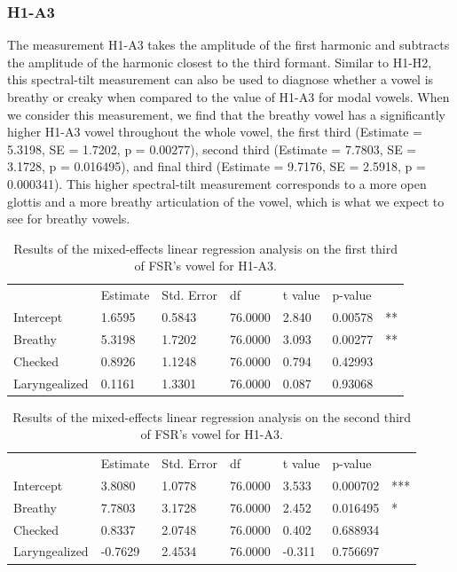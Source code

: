 \documentclass[12pt, letterpaper]{article}
\providecommand{\lsptoprule}{\midrule\toprule}
\providecommand{\lspbottomrule}{\bottomrule\midrule}
\begin{document}
\subsubsection{H1-A3}

The measurement H1-A3 takes the amplitude of the first harmonic and subtracts the amplitude of the harmonic closest to the third formant. Similar to H1-H2, this spectral-tilt measurement can also be used to diagnose whether a vowel is breathy or creaky when compared to the value of H1-A3 for modal vowels. When we consider this measurement, we find that the breathy vowel has a significantly higher H1-A3 vowel throughout the whole vowel, the first third (Estimate = 5.3198, SE = 1.7202, p = 0.00277), second third (Estimate = 7.7803, SE = 3.1728, p = 0.016495), and final third (Estimate = 9.7176, SE = 2.5918, p = 0.000341). This higher spectral-tilt measurement corresponds to a more open glottis and a more breathy articulation of the vowel, which is what we expect to see for breathy vowels. 

\begin{table}[!h]
    \centering
    \caption{Results of the mixed-effects linear regression analysis on the first third of FSR's vowel for H1-A3. }
    \label{tab:FSR_H1A3_First}
    \begin{tabular}{lllllll}
	\lsptoprule
					&  Estimate  & Std. Error & df & t value & p-value & \\
        Intercept       &  1.6595  & 0.5843 & 76.0000 & 2.840  & 0.00578 & ** \\  
  	Breathy   		&  5.3198  & 1.7202 & 76.0000 & 3.093  & 0.00277 & **\\
	Checked    		&  0.8926  & 1.1248 & 76.0000 & 0.794  & 0.42993 & \\
	Laryngealized	&  0.1161  & 1.3301 & 76.0000 & 0.087  & 0.93068 & \\
        \lspbottomrule
    \end{tabular}
\end{table}

\begin{table}[!h]
    \centering
    \caption{Results of the mixed-effects linear regression analysis on the second third of FSR's vowel for H1-A3. }
    \label{tab:FSR_H1A3_Second}
    \begin{tabular}{lllllll}
	\lsptoprule
					&  Estimate  & Std. Error & df & t value & p-value & \\
        Intercept       &  3.8080  & 1.0778 & 76.0000 &  3.533  & 0.000702 & *** \\  
  	Breathy   		&  7.7803  & 3.1728 & 76.0000 &  2.452  & 0.016495 & *\\
	Checked    		&  0.8337  & 2.0748 & 76.0000 &  0.402  & 0.688934 & \\
	Laryngealized	& -0.7629  & 2.4534 & 76.0000 & -0.311  & 0.756697 & \\
        \lspbottomrule
    \end{tabular}
\end{table}
\end{document}

